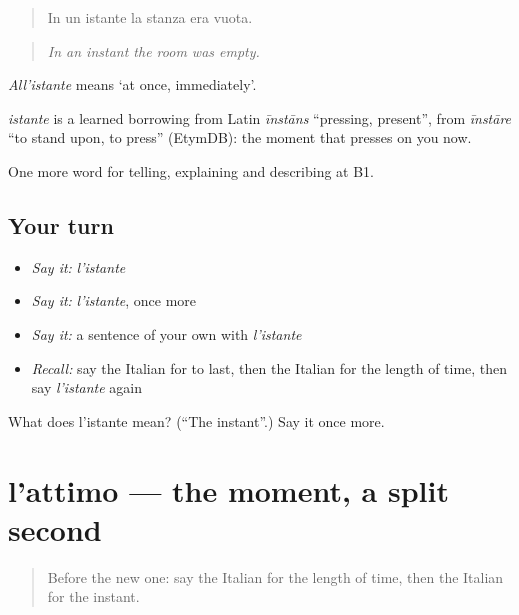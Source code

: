 \begin{quote}
In un istante la stanza era vuota.
\end{quote}

\begin{quote}
\emph{In an instant the room was empty.}
\end{quote}

\emph{All'istante} means ‘at once, immediately’.

\begin{cousinweb}
\emph{istante} is a learned borrowing from Latin \emph{īnstāns} \textquotedblleft{}pressing, present\textquotedblright{}, from \emph{īnstāre} \textquotedblleft{}to stand upon, to press\textquotedblright{} (EtymDB): the moment that presses on you now.
\end{cousinweb}

\begin{grammarlens}[title={What you've built}]
One more word for telling, explaining and describing at B1.
\end{grammarlens}

\subsection*{Your turn}
\begin{itemize}
\raggedright
  \item \emph{Say it:} \emph{l'istante}
  \item \emph{Say it:} \emph{l'istante}, once more
  \item \emph{Say it:} a sentence of your own with \emph{l'istante}
  \item \emph{Recall:} say the Italian for to last, then the Italian for the length of time, then say \emph{l'istante} again
\end{itemize}

\begin{tcolorbox}[breakable,colback=teal!4,colframe=teal!35!black,title={Before you move on}]
What does l'istante mean? (\textquotedblleft{}The instant\textquotedblright{}.) Say it once more.
\end{tcolorbox}
\section[l'attimo]{l'attimo — the moment, a split second}

\label{lesson:IT-C277-attimo}



\begin{quote}
Before the new one: say the Italian for the length of time, then the Italian for the instant.
\end{quote}

